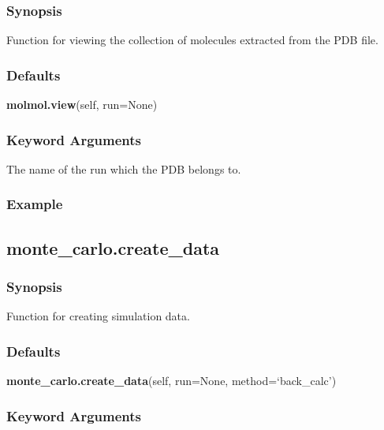 \subsubsection{Synopsis}

Function for viewing the collection of molecules extracted from the PDB file.



\subsubsection{Defaults}

\textsf{\textbf{molmol.view}(self, run=None)}


\subsubsection{Keyword Arguments}

  The name of the run which the PDB belongs to. 




\subsubsection{Example}





\newpage

\subsection{monte\_carlo.create\_data}


\subsubsection{Synopsis}

Function for creating simulation data.



\subsubsection{Defaults}

\textsf{\textbf{monte\_carlo.create\_data}(self, run=None, method=`back\_calc')}


\subsubsection{Keyword Arguments}

